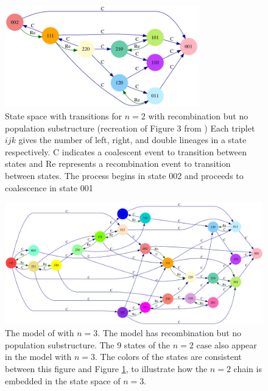 \documentclass[11pt,oneside]{amsart}
\begin{document}
\begin{figure}[ht]
\centering
\includegraphics[width=0.75\textwidth]{n2_recomb_color.png}
\caption{State space with transitions for $n = 2$ with recombination but no population substructure (recreation of Figure 3 from \cite{SimonsenChurchill1997}) Each triplet $ijk$ gives the number of left, right, and double lineages in a state respectively. C indicates a coalescent event to transition between states and Re represents a recombination event to transition between states. The process begins in state 002 and proceeds to coalescence in state 001}
\label{Figure: n = 2 recomb}
\end{figure}

\begin{figure}[ht]
\centering
\includegraphics[width=1.00\textwidth]{n3_recomb_color.png}
\caption{The model of \cite{SimonsenChurchill1997} with $n = 3$. The model has recombination but no population substructure. The 9 states of the $n = 2$ case also appear in the model with $n = 3$. The colors of the states are consistent between this figure and Figure \ref{Figure: n = 2 recomb}, to illustrate how the $n = 2$ chain is embedded in the state space of $n = 3$.}
\label{Figure: n = 3 recomb}
\end{figure}
\end{document}

